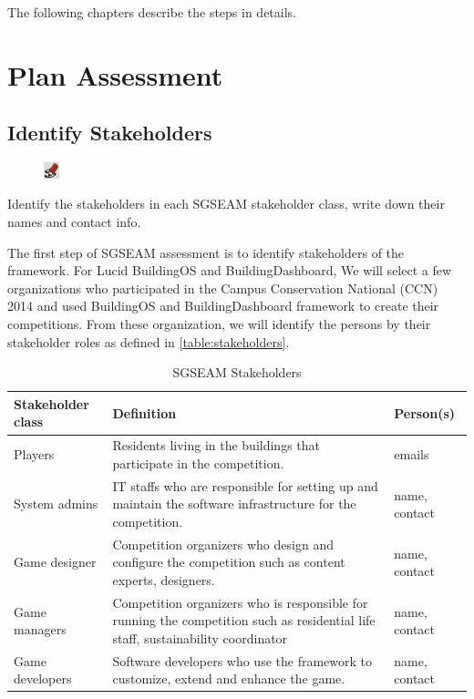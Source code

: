\documentclass[11pt,oneside]{book}
\newcommand\tabhead[1]{\small\textbf{#1}}
\begin{document}
 The following chapters describe the steps in details.

\chapter{Plan Assessment}

\section{Identify Stakeholders}

\begin{shadebox}
\begin{figure}
\vspace{-15pt}\hspace{-10pt}
    \includegraphics[width=0.04\textwidth]{note-icon}
\end{figure}

Identify the stakeholders in each SGSEAM stakeholder class, write down their names and contact info.

\end{shadebox}

The first step of SGSEAM assessment is to identify stakeholders of the framework. For Lucid BuildingOS and BuildingDashboard, We will select a few organizations who participated in the Campus Conservation National (CCN) 2014 and used BuildingOS and BuildingDashboard framework to create their competitions. From these organization, we will identify the persons by their stakeholder roles as defined in \autoref{table:stakeholders}. 

\begin{table}[ht!]
  \centering
  \begin{tabular}{|p{}|p{}|p{}|}
    \hline
    \tabhead{Stakeholder class} &
    \tabhead{Definition} &
    \tabhead{Person(s)} \\
    \hline
    Players &
    Residents living in the buildings that participate in the competition. &
    emails \\
    \hline
    System admins &
    IT staffs who are responsible for setting up and maintain the software infrastructure for the competition. &
    name, contact \\
    \hline
    Game designer &
    Competition organizers who design and configure the competition such as content experts, designers. &
    name, contact \\
    \hline
    Game managers &
    Competition organizers who is responsible for running the competition such as residential life staff, sustainability coordinator&
    name, contact\\
    \hline
    Game developers &
    Software developers who use the framework to customize, extend and enhance the game. &
    name, contact \\
    \hline
  \end{tabular}
  \caption{SGSEAM Stakeholders}
  \label{table:stakeholders}
\end{table}
\end{document}
